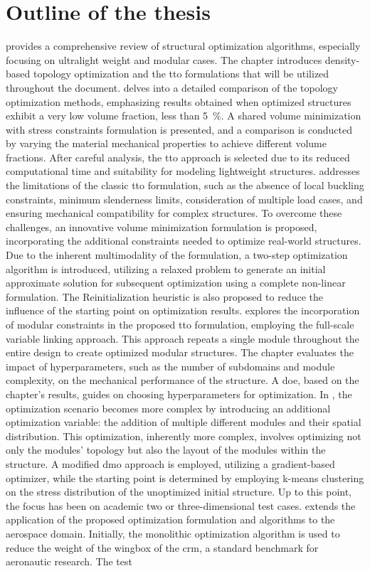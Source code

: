 \section*{Outline of the thesis}
 provides a comprehensive review of structural optimization algorithms, especially focusing on ultralight weight and modular cases. The chapter introduces density-based topology optimization and the \gls{tto} formulations that will be utilized throughout the document.  delves into a detailed comparison of the topology optimization methods, emphasizing results obtained when optimized structures exhibit a very low volume fraction, \ie less than \qty{5}{\percent}. A shared volume minimization with stress constraints formulation is presented, and a comparison is conducted by varying the material mechanical properties to achieve different volume fractions. After careful analysis, the \gls{tto} approach is selected due to its reduced computational time and suitability for modeling lightweight structures.  addresses the limitations of the classic \gls{tto} formulation, such as the absence of local buckling constraints, minimum slenderness limits, consideration of multiple load cases, and ensuring mechanical compatibility for complex structures. To overcome these challenges, an innovative volume minimization formulation is proposed, incorporating the additional constraints needed to optimize real-world structures. Due to the inherent multimodality of the formulation, a two-step optimization algorithm is introduced, utilizing a relaxed problem to generate an initial approximate solution for subsequent optimization using a complete non-linear formulation. The Reinitialization heuristic is also proposed to reduce the influence of the starting point on optimization results.  explores the incorporation of modular constraints in the proposed \gls{tto} formulation, employing the full-scale variable linking approach. This approach repeats a single module throughout the entire design to create optimized modular structures. The chapter evaluates the impact of hyperparameters, such as the number of subdomains and module complexity, on the mechanical performance of the structure. A \gls{doe}, based on the chapter's results, guides on choosing hyperparameters for optimization. In , the optimization scenario becomes more complex by introducing an additional optimization variable: the addition of multiple different modules and their spatial distribution. This optimization, inherently more complex, involves optimizing not only the modules' topology but also the layout of the modules within the structure. A modified \gls{dmo} approach is employed, utilizing a gradient-based optimizer, while the starting point is determined by employing k-means clustering on the stress distribution of the unoptimized initial structure. Up to this point, the focus has been on academic two or three-dimensional test cases.  extends the application of the proposed optimization formulation and algorithms to the aerospace domain. Initially, the monolithic optimization algorithm is used to reduce the weight of the wingbox of the \gls{crm}, a standard benchmark for aeronautic research. The test 